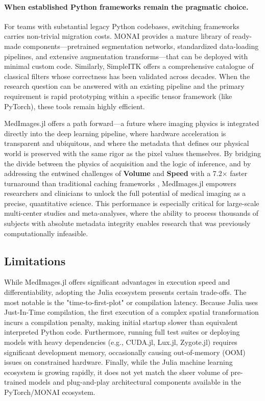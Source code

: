 \documentclass[a4paper,10pt]{elsarticle}
\begin{document}
\paragraph{When established Python frameworks remain the pragmatic choice.}
For teams with substantial legacy Python codebases, switching frameworks carries non-trivial migration costs. MONAI provides a mature library of ready-made components---pretrained segmentation networks, standardized data-loading pipelines, and extensive augmentation transforms---that can be deployed with minimal custom code. Similarly, SimpleITK offers a comprehensive catalogue of classical filters whose correctness has been validated across decades. When the research question can be answered with an existing pipeline and the primary requirement is rapid prototyping within a specific tensor framework (like PyTorch), these tools remain highly efficient.

MedImages.jl offers a path forward---a future where imaging physics is integrated directly into the deep learning pipeline, where hardware acceleration is transparent and ubiquitous, and where the metadata that defines our physical world is preserved with the same rigor as the pixel values themselves. By bridging the divide between the physics of acquisition and the logic of inference, and by addressing the entwined challenges of \textbf{Volume} and \textbf{Speed} with a 7.2$\times$ faster turnaround than traditional caching frameworks \cite{Shi_2023}, MedImages.jl empowers researchers and clinicians to unlock the full potential of medical imaging as a precise, quantitative science. This performance is especially critical for large-scale multi-center studies and meta-analyses, where the ability to process thousands of subjects with absolute metadata integrity enables research that was previously computationally infeasible.


\subsection*{Limitations}
While MedImages.jl offers significant advantages in execution speed and differentiability, adopting the Julia ecosystem presents certain trade-offs. The most notable is the "time-to-first-plot" or compilation latency. Because Julia uses Just-In-Time compilation, the first execution of a complex spatial transformation incurs a compilation penalty, making initial startup slower than equivalent interpreted Python code. Furthermore, running full test suites or deploying models with heavy dependencies (e.g., CUDA.jl, Lux.jl, Zygote.jl) requires significant development memory, occasionally causing out-of-memory (OOM) issues on constrained hardware. Finally, while the Julia machine learning ecosystem is growing rapidly, it does not yet match the sheer volume of pre-trained models and plug-and-play architectural components available in the PyTorch/MONAI ecosystem.
\end{document}

